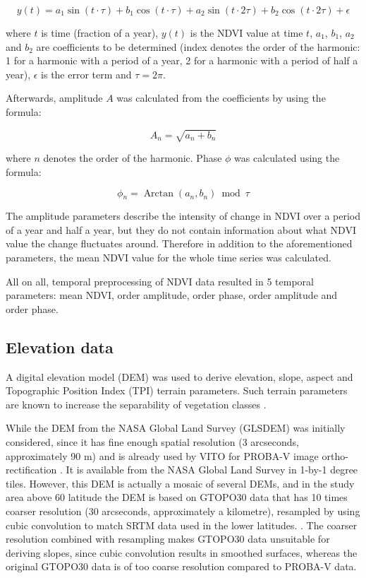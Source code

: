 \documentclass[a4paper,10pt]{book}
\DeclareMathOperator{\Arctan}{Arctan}
\begin{document}
$$ y(t) = a_1 \sin{(t\cdot{\tau{}})} + b_1 \cos{(t\cdot{\tau{}})} + a_2 \sin{(t\cdot{2\tau{}})} + b_2 \cos{(t\cdot{2\tau{}})} + \epsilon{} $$

where $t$ is time (fraction of a year), $y(t)$ is the NDVI value at time $t$, $a_1$, $b_1$, $a_2$ and $b_2$ are coefficients to be determined (index denotes the order of the harmonic: 1 for a harmonic with a period of a year, 2 for a harmonic with a period of half a year), $\epsilon{}$ is the error term and $\tau{} = 2\pi{}$.

Afterwards, amplitude $A$ was calculated from the coefficients by using the formula:

$$ A_n = \sqrt{a_n + b_n} $$

where $n$ denotes the order of the harmonic. Phase $\phi{}$ was calculated using the formula:

$$ \phi{}_n = \Arctan{(a_n, b_n)} \bmod{\tau{}} $$

The amplitude parameters describe the intensity of change in NDVI over a period of a year and half a year, but they do not contain information about what NDVI value the change fluctuates around. Therefore in addition to the aforementioned parameters, the mean NDVI value for the whole time series was calculated.

All on all, temporal preprocessing of NDVI data resulted in 5 temporal parameters: mean NDVI,  order amplitude,  order phase,  order amplitude and  order phase.

\subsection{Elevation data}

A digital elevation model (DEM) was used to derive elevation, slope, aspect and Topographic Position Index (TPI) terrain parameters. Such terrain parameters are known to increase the separability of vegetation classes \citep{burrough2001fuzzy}.

While the DEM from the NASA Global Land Survey (GLSDEM) was initially considered, since it has fine enough spatial resolution (3 arcseconds, approximately 90 m) and is already used by VITO for PROBA-V image ortho-rectification \citep{probavguide}. It is available from the NASA Global Land Survey in 1-by-1 degree tiles. However, this DEM is actually a mosaic of several DEMs, and in the study area above 60\textdegree{} latitude the DEM is based on GTOPO30 data that has 10 times coarser resolution (30 arcseconds, approximately a kilometre), resampled by using cubic convolution to match SRTM data used in the lower latitudes. \citep{glsdemtechguide}. The coarser resolution combined with resampling makes GTOPO30 data unsuitable for deriving slopes, since cubic convolution results in smoothed surfaces, whereas the original GTOPO30 data is of too coarse resolution compared to PROBA-V data.
\end{document}
